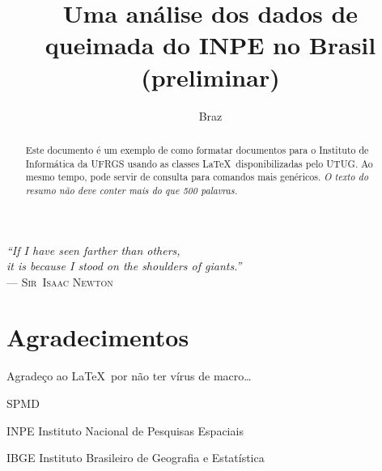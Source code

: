 \documentclass[cic,tc]{iiufrgs}
\title{Uma análise dos dados de queimada do INPE no Brasil (preliminar)}
\author{Braz}{José Henrique da Silva}
\begin{document}
\maketitle

\clearpage
\begin{flushright}
\mbox{}\vfill
{\sffamily\itshape
``If I have seen farther than others,\\
it is because I stood on the shoulders of giants.''\\}
--- \textsc{Sir~Isaac Newton}
\end{flushright}

\chapter*{Agradecimentos}
Agradeço ao \LaTeX\ por não ter vírus de macro\ldots

\tableofcontents

\begin{listofabbrv}{SPMD}
        \item[INPE] Instituto Nacional de Pesquisas Espaciais
        \item[IBGE] Instituto Brasileiro de Geografia e Estatística
\end{listofabbrv}


\listoffigures


\begin{abstract}
Este documento é um exemplo de como formatar documentos para o
Instituto de Informática da UFRGS usando as classes \LaTeX\
disponibilizadas pelo UTUG\@. Ao mesmo tempo, pode servir de consulta
para comandos mais genéricos. \emph{O texto do resumo não deve
conter mais do que 500 palavras.}
\end{abstract}
\end{document}
